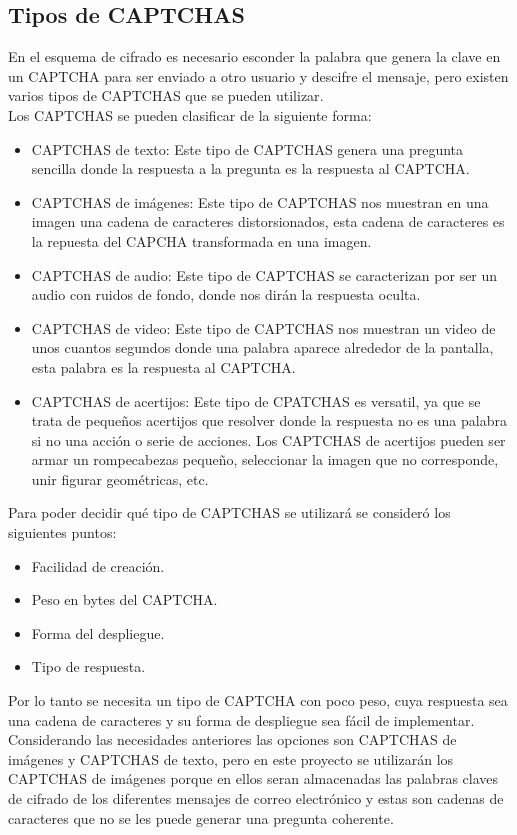 \documentclass[12pt,oneside,onecolumn,openany]{report}
\begin{document}
\subsection{Tipos de CAPTCHAS}
En el esquema de cifrado es necesario esconder la palabra que genera la clave en un CAPTCHA para ser enviado a otro usuario y descifre el mensaje, pero existen varios tipos de CAPTCHAS que se pueden utilizar\cite{cit}.\\Los CAPTCHAS se pueden clasificar de la siguiente forma:
\begin{itemize}
 \item CAPTCHAS de texto: Este tipo de CAPTCHAS genera una pregunta sencilla donde la respuesta a la pregunta es la respuesta al CAPTCHA.
 \item CAPTCHAS de imágenes: Este tipo de CAPTCHAS nos muestran en una imagen una cadena de caracteres distorsionados, esta cadena de caracteres es la repuesta del CAPCHA transformada en una imagen.
 \item CAPTCHAS de audio: Este tipo de CAPTCHAS se caracterizan por  ser un audio con ruidos de fondo, donde nos dirán la respuesta oculta.
 \item CAPTCHAS de video: Este tipo de CAPTCHAS nos muestran un video de unos cuantos segundos donde una palabra aparece alrededor de la pantalla, esta palabra es la respuesta al CAPTCHA.
 \item CAPTCHAS de acertijos: Este tipo de CPATCHAS es versatil, ya que se trata de pequeños acertijos que resolver donde la respuesta no es una palabra si no una acción o serie de acciones. Los CAPTCHAS de acertijos pueden ser armar un rompecabezas pequeño, seleccionar la imagen que no corresponde, unir figurar geométricas, etc. 
\end{itemize}
Para poder decidir qué tipo de CAPTCHAS se utilizará se consideró los siguientes puntos:
\begin{itemize}
 \item Facilidad de creación.
 \item Peso en bytes del CAPTCHA.
 \item Forma del despliegue.
 \item Tipo de respuesta.
\end{itemize}
Por lo tanto se necesita un tipo de CAPTCHA con poco peso, cuya respuesta sea una cadena de caracteres y su forma de despliegue sea fácil de implementar. \\
Considerando las necesidades anteriores las opciones son CAPTCHAS de imágenes y CAPTCHAS de texto, pero en este proyecto se utilizarán los CAPTCHAS de imágenes porque en ellos seran almacenadas las palabras claves de cifrado de los diferentes mensajes de correo electrónico y estas son cadenas de caracteres que no se les puede generar una pregunta coherente. \\
\end{document}
